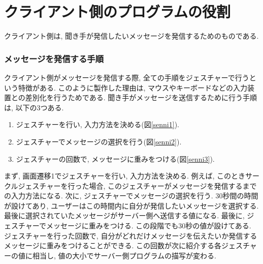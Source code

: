 \documentclass{funthesis}
\begin{document}

\section{クライアント側のプログラムの役割}
クライアント側は, 聞き手が発信したいメッセージを発信するためのものである. 

\subsubsection{メッセージを発信する手順}

クライアント側がメッセージを発信する際, 全ての手順をジェスチャーで行うという特徴がある. このように製作した理由は, マウスやキーボードなどの入力装置との差別化を行うためである. 聞き手がメッセージを送信するために行う手順は, 以下の3つある. 
\begin{enumerate}
 \item ジェスチャーを行い, 入力方法を決める(図\ref{senni1}). 
 \item ジェスチャーでメッセージの選択を行う(図\ref{senni2}). 
 \item ジェスチャーの回数で, メッセージに重みをつける(図\ref{senni3}). 
\end{enumerate}

まず, 画面遷移1でジェスチャーを行い, 入力方法を決める. 例えば, このときサークルジェスチャーを行った場合, このジェスチャーがメッセージを発信するまでの入力方法になる. 
次に, ジェスチャーでメッセージの選択を行う. 30秒間の時間が設けてあり, ユーザーはこの時間内に自分が発信したいメッセージを選択する. 最後に選択されていたメッセージがサーバー側へ送信する値になる. %
最後に, ジェスチャーでメッセージに重みをつける. この段階でも30秒の値が設けてある. ジェスチャーを行った回数で, 自分がどれだけメッセージを伝えたいか発信するメッセージに重みをつけることができる. この回数が次に紹介する各ジェスチャーの値に相当し, 値の大小でサーバー側プログラムの描写が変わる. 
\end{document}
